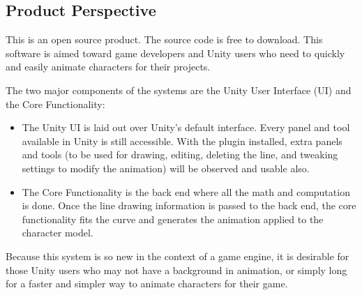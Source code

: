 \subsection{Product Perspective}
This is an open source product. The source code is free to download. This software is aimed toward game developers and Unity users who need to quickly and easily animate characters for their projects.

The two major components of the systems are the Unity User Interface (UI) and the Core Functionality:

\begin{itemize}
\item The Unity UI is laid out over Unity's default interface. Every panel and tool available in Unity is still accessible. With the plugin installed, extra panels and tools (to be used for drawing, editing, deleting the line, and tweaking settings to modify the animation) will be observed and usable also.

\item The Core Functionality is the back end where all the math and computation is done. Once the line drawing information is passed to the back end, the core functionality fits the curve and generates the animation applied to the character model.

\end{itemize}

Because this system is so new in the context of a game engine, it is desirable for those Unity users who may not have a background in animation, or simply long for a faster and simpler way to animate characters for their game.